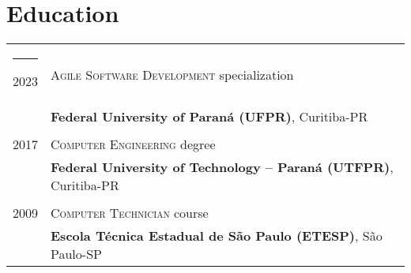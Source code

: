 \documentclass[a4paper,11pt]{article}
\begin{document}
\section{Education}
\begin{tabular}{rl}




\rule{2cm}{0pt} 2023 & \textsc{Agile Software Development} specialization \\ &\normalsize\textbf{Federal University of Paraná (UFPR)}, Curitiba-PR\\&\\
2017 & \textsc{Computer Engineering} degree \\ &\normalsize\textbf{Federal University of Technology – Paraná (UTFPR)}, Curitiba-PR\\&\\
2009 & \textsc{Computer Technician} course \\ &\normalsize\textbf{Escola Técnica Estadual de São Paulo (ETESP)}, São Paulo-SP
\end{tabular}

\end{document}
